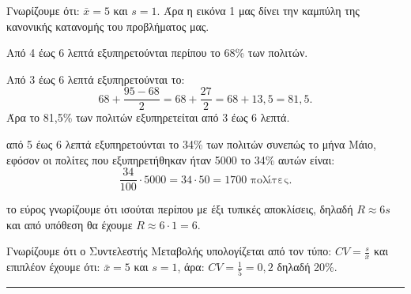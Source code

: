 \begin{alist}
    \item Γνωρίζουμε ότι: $\bar{x} = 5$ και $s = 1$. Άρα η εικόνα 1 μας δίνει την καμπύλη της κανονικής κατανομής του προβλήματος μας.

    \begin{rlist}
        \item Από 4 έως 6 λεπτά εξυπηρετούνται περίπου το 68\% των πολιτών.
        \item Από 3 έως 6 λεπτά εξυπηρετούνται το: 
        \[ 68 + \frac{95-68}{2} = 68 + \frac{27}{2} = 68 + 13,5 = 81,5. \]
        Άρα το 81,5\% των πολιτών εξυπηρετείται από 3 έως 6 λεπτά.
    \end{rlist}
    
    \item από 5 έως 6 λεπτά εξυπηρετούνται το 34\% των πολιτών συνεπώς το μήνα Μάιο, εφόσον οι πολίτες που εξυπηρετήθηκαν ήταν 5000 το 34\% αυτών είναι:
    \[ \frac{34}{100} \cdot 5000 = 34 \cdot 50 = 1700 \text{ πολίτες}. \]
    
    \item το εύρος γνωρίζουμε ότι ισούται περίπου με έξι τυπικές αποκλίσεις, δηλαδή $R \approx 6s$ και από υπόθεση θα έχουμε $R \approx 6 \cdot 1 = 6$.
    
    \item Γνωρίζουμε ότι ο Συντελεστής Μεταβολής υπολογίζεται από τον τύπο: $CV = \frac{s}{\bar{x}}$ και επιπλέον έχουμε ότι: $\bar{x} = 5$ και $s = 1$, άρα: $CV = \frac{1}{5} = 0,2$ δηλαδή 20\%.
\end{alist}
\vspace{6mm}
\noindent\rule{\textwidth}{0.4pt}
\vspace{6mm}

